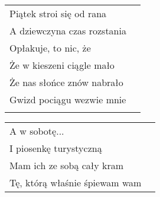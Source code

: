 \documentclass[a5paper]{article}
\begin{document}
\noindent
\begin{tabular}{@{}p{7.50cm}p{3cm}@{}}
Piątek stroi się od rana \\
A dziewczyna czas rozstania \\
Opłakuje, to nic, że \\
Że w kieszeni ciągle mało \\
Że nas słońce znów nabrało \\
Gwizd pociągu wezwie mnie \\ \\
\end{tabular}

\noindent
\begin{tabular}{@{}p{7.50cm}p{3cm}@{}}
A w sobotę... \\
I piosenkę turystyczną \\
Mam ich ze sobą cały kram \\
Tę, którą właśnie śpiewam wam
\end{tabular}
\end{document}
